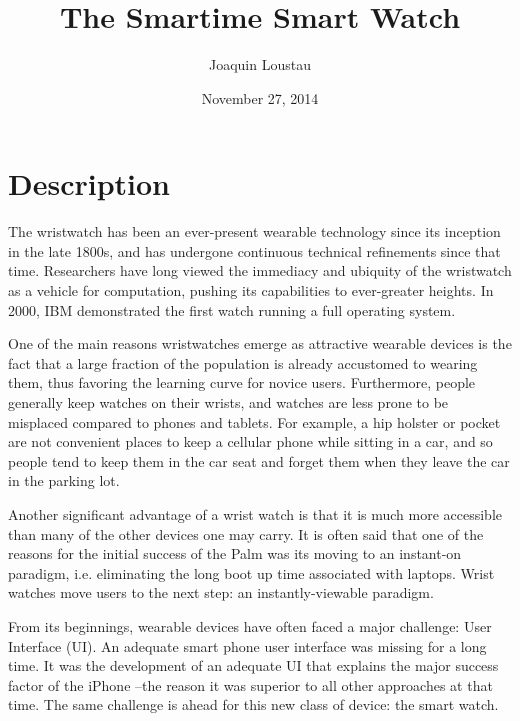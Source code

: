 \documentclass{article}
\title{The Smartime Smart Watch}
\author{Joaquin Loustau}
\date{November 27, 2014}
\begin{document}
\maketitle

\abstract{
}

\pagebreak
\tableofcontents

\pagebreak

%
%
\section{Description}
The wristwatch has been an ever-present wearable technology since its inception in the late 1800s, and has undergone continuous technical refinements since that time. Researchers have long viewed the immediacy and ubiquity of the wristwatch as a vehicle for computation, pushing its capabilities to ever-greater heights. In 2000, IBM demonstrated the first watch running a full operating system.  

One of the main reasons wristwatches emerge as attractive wearable devices is the fact that a large fraction of the population is already accustomed to wearing them, thus favoring the learning curve for novice users. Furthermore, people generally keep watches on their wrists, and watches are less prone to be misplaced compared to phones and tablets. For example, a hip holster or pocket are not convenient places to keep a cellular phone while sitting in a car, and so people tend to keep them in the car seat and forget them when they leave the car in the parking lot. 

Another significant advantage of a wrist watch is that it is much more accessible than many of the other devices one may carry. It is often said that one of the reasons for the initial success of the Palm was its moving to an instant-on paradigm, i.e. eliminating the long boot up time associated with laptops. Wrist watches move users to the next step: an instantly-viewable paradigm.

From its beginnings, wearable devices have often faced a major challenge: User Interface (UI). An adequate smart phone user interface was missing for a long time. It was the development of an adequate UI that explains the major success factor of the iPhone --the reason it was superior to all other approaches at that time. The same challenge is ahead for this new class of device: the smart watch. 
\end{document}
